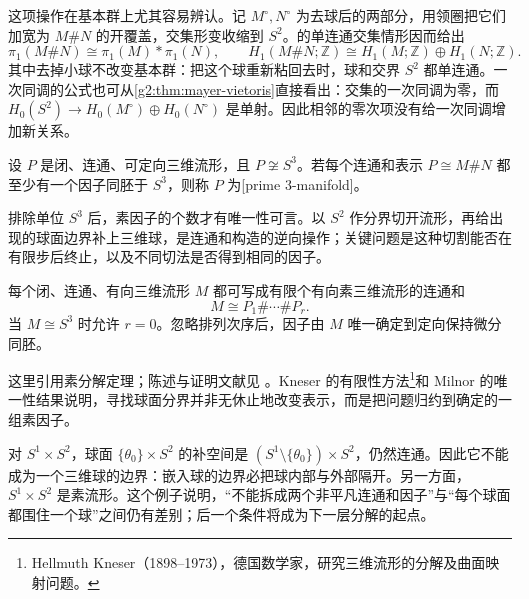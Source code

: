 \ProseParagraphBreak

这项操作在基本群上尤其容易辨认。记 \(M^\circ,N^\circ\) 为去球后的两部分，用领圈把它们加宽为 \(M\#N\) 的开覆盖，交集形变收缩到 \(S^2\)。的单连通交集情形因而给出
\begin{equation}\label{g2:eq:three-connected-sum-groups}
	\pi_1(M\#N)\cong\pi_1(M)*\pi_1(N),\qquad
	H_1(M\#N;\mathbb Z)\cong H_1(M;\mathbb Z)\oplus H_1(N;\mathbb Z).
\end{equation}
其中去掉小球不改变基本群：把这个球重新粘回去时，球和交界 \(S^2\) 都单连通。一次同调的公式也可从\cref{g2:thm:mayer-vietoris}直接看出：交集的一次同调为零，而 \(H_0(S^2)\to H_0(M^\circ)\oplus H_0(N^\circ)\) 是单射。因此相邻的零次项没有给一次同调增加新关系。

\begin{definition}\label{g2:def:prime-three-manifold}
	设 \(P\) 是闭、连通、可定向三维流形，且 \(P\not\cong S^3\)。若每个连通和表示 \(P\cong M\#N\) 都至少有一个因子同胚于 \(S^3\)，则称 \(P\) 为[prime 3-manifold]。
\end{definition}

排除单位 \(S^3\) 后，素因子的个数才有唯一性可言。以 \(S^2\) 作分界切开流形，再给出现的球面边界补上三维球，是连通和构造的逆向操作；关键问题是这种切割能否在有限步后终止，以及不同切法是否得到相同的因子。

\begin{theorem}\label{g2:thm:prime-decomposition-three}
	每个闭、连通、有向三维流形 \(M\) 都可写成有限个有向素三维流形的连通和
	\[
		M\cong P_1\#\cdots\#P_r.
	\]
	当 \(M\cong S^3\) 时允许 \(r=0\)。忽略排列次序后，因子由 \(M\) 唯一确定到定向保持微分同胚。
\end{theorem}

这里引用素分解定理；陈述与证明文献见 \cite[第1.2节]{AschenbrennerFriedlWilton2015}。Kneser 的有限性方法\footnote{Hellmuth Kneser（1898--1973），德国数学家，研究三维流形的分解及曲面映射问题。}和 Milnor 的唯一性结果说明，寻找球面分界并非无休止地改变表示，而是把问题归约到确定的一组素因子。

\ProseParagraphBreak

对 \(S^1\times S^2\)，球面 \(\{\theta_0\}\times S^2\) 的补空间是 \((S^1\setminus\{\theta_0\})\times S^2\)，仍然连通。因此它不能成为一个三维球的边界：嵌入球的边界必把球内部与外部隔开。另一方面，\(S^1\times S^2\) 是素流形。这个例子说明，“不能拆成两个非平凡连通和因子”与“每个球面都围住一个球”之间仍有差别；后一个条件将成为下一层分解的起点。

